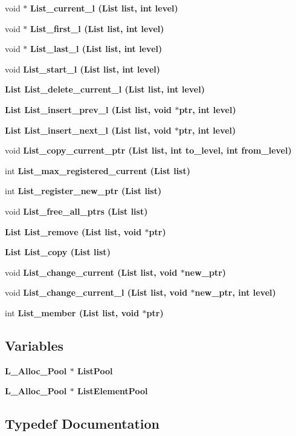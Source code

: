 \begin{CompactItemize}
void $\ast$ \bf{List\_\-current\_\-l} (\bf{List} \bf{list}, int level)
\item 
void $\ast$ \bf{List\_\-first\_\-l} (\bf{List} \bf{list}, int level)
\item 
void $\ast$ \bf{List\_\-last\_\-l} (\bf{List} \bf{list}, int level)
\item 
void \bf{List\_\-start\_\-l} (\bf{List} \bf{list}, int level)
\item 
\bf{List} \bf{List\_\-delete\_\-current\_\-l} (\bf{List} \bf{list}, int level)
\item 
\bf{List} \bf{List\_\-insert\_\-prev\_\-l} (\bf{List} \bf{list}, void $\ast$ptr, int level)
\item 
\bf{List} \bf{List\_\-insert\_\-next\_\-l} (\bf{List} \bf{list}, void $\ast$ptr, int level)
\item 
void \bf{List\_\-copy\_\-current\_\-ptr} (\bf{List} \bf{list}, int to\_\-level, int from\_\-level)
\item 
int \bf{List\_\-max\_\-registered\_\-current} (\bf{List} \bf{list})
\item 
int \bf{List\_\-register\_\-new\_\-ptr} (\bf{List} \bf{list})
\item 
void \bf{List\_\-free\_\-all\_\-ptrs} (\bf{List} \bf{list})
\item 
\bf{List} \bf{List\_\-remove} (\bf{List} \bf{list}, void $\ast$ptr)
\item 
\bf{List} \bf{List\_\-copy} (\bf{List} \bf{list})
\item 
void \bf{List\_\-change\_\-current} (\bf{List} \bf{list}, void $\ast$new\_\-ptr)
\item 
void \bf{List\_\-change\_\-current\_\-l} (\bf{List} \bf{list}, void $\ast$new\_\-ptr, int level)
\item 
int \bf{List\_\-member} (\bf{List} \bf{list}, void $\ast$ptr)
\end{CompactItemize}
\subsection*{Variables}
\begin{CompactItemize}
\item 
\bf{L\_\-Alloc\_\-Pool} $\ast$ \bf{List\-Pool}
\item 
\bf{L\_\-Alloc\_\-Pool} $\ast$ \bf{List\-Element\-Pool}
\end{CompactItemize}


\subsection{Typedef Documentation}
